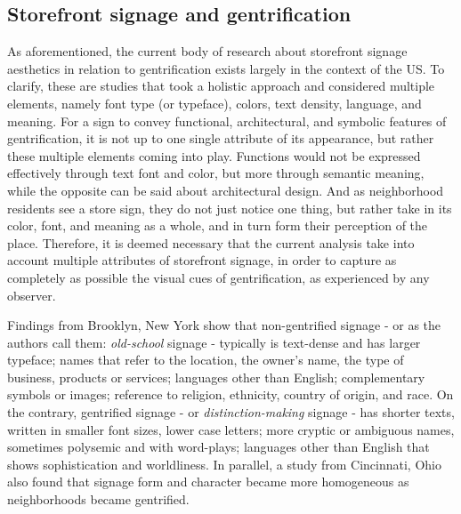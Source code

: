 

\subsection{Storefront signage and gentrification}

As aforementioned, the current body of research about storefront signage aesthetics in relation to gentrification exists largely in the context of the US. To clarify, these are studies that took a holistic approach and considered multiple elements, namely font type (or typeface), colors, text density, language, and meaning. For a sign to convey functional, architectural, and symbolic features of gentrification, it is not up to one single attribute of its appearance, but rather these multiple elements coming into play. Functions would not be expressed effectively through text font and color, but more through semantic meaning, while the opposite can be said about architectural design. And as neighborhood residents see a store sign, they do not just notice one thing, but rather take in its color, font, and meaning as a whole, and in turn form their perception of the place. Therefore, it is deemed necessary that the current analysis take into account multiple attributes of storefront signage, in order to capture as completely as possible the visual cues of gentrification, as experienced by any observer.

Findings from Brooklyn, New York\cite{trinch_signsays_2017, snajdr_oldschool_2018, snajdr_preserve_2022} show that non-gentrified signage - or as the authors call them: \textit{old-school} signage - typically is text-dense and has larger typeface; names that refer to the location, the owner's name, the type of business, products or services; languages other than English; complementary symbols or images; reference to religion, ethnicity, country of origin, and race. On the contrary, gentrified signage - or \textit{distinction-making} signage - has shorter texts, written in smaller font sizes, lower case letters; more cryptic or ambiguous names, sometimes polysemic and with word-plays; languages other than English that shows sophistication and worldliness. In parallel, a study from Cincinnati, Ohio \cite{rahman2020} also found that signage form and character became more homogeneous as neighborhoods became gentrified.

